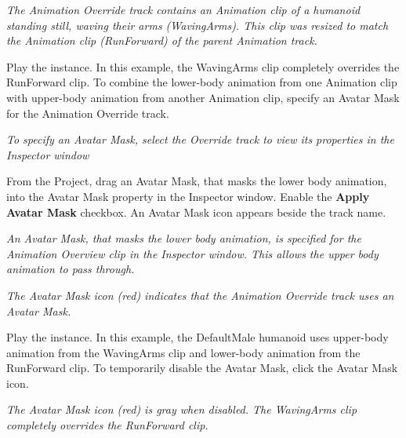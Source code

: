 {\itshape The Animation Override track contains an Animation clip of a humanoid standing still, waving their arms (Waving\+Arms). This clip was resized to match the Animation clip (Run\+Forward) of the parent Animation track.}

Play the  instance. In this example, the Waving\+Arms clip completely overrides the Run\+Forward clip. To combine the lower-\/body animation from one Animation clip with upper-\/body animation from another Animation clip, specify an Avatar Mask for the Animation Override track.



{\itshape To specify an Avatar Mask, select the Override track to view its properties in the Inspector window}

From the Project, drag an Avatar Mask, that masks the lower body animation, into the Avatar Mask property in the Inspector window. Enable the {\bfseries{Apply Avatar Mask}} checkbox. An Avatar Mask icon appears beside the track name.



{\itshape An Avatar Mask, that masks the lower body animation, is specified for the Animation Overview clip in the Inspector window. This allows the upper body animation to pass through.}



{\itshape The Avatar Mask icon (red) indicates that the Animation Override track uses an Avatar Mask.}

Play the  instance. In this example, the Default\+Male humanoid uses upper-\/body animation from the Waving\+Arms clip and lower-\/body animation from the Run\+Forward clip. To temporarily disable the Avatar Mask, click the Avatar Mask icon.



{\itshape The Avatar Mask icon (red) is gray when disabled. The Waving\+Arms clip completely overrides the Run\+Forward clip.} 